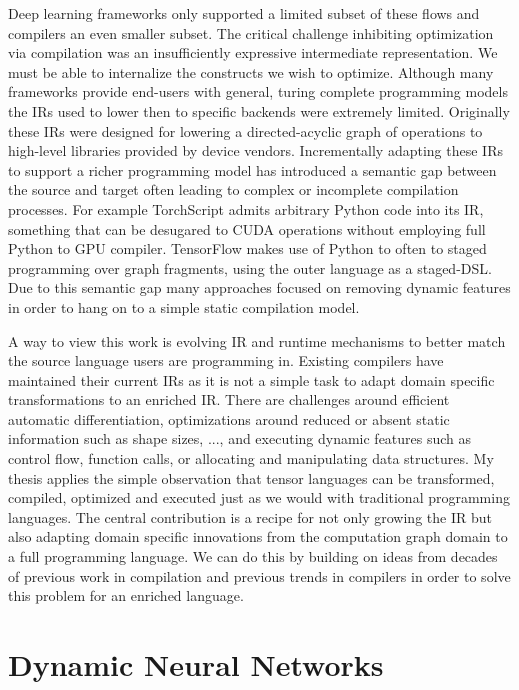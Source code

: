 Deep learning frameworks only supported a limited subset of these flows
  and compilers an even smaller subset.
The critical challenge inhibiting optimization via compilation
  was an insufficiently expressive intermediate representation.
We must be able to internalize the constructs we wish to optimize.
Although many frameworks provide end-users with general, turing
  complete programming models the IRs used to lower then to specific
  backends were extremely limited.
Originally these IRs were designed for lowering a directed-acyclic
  graph of operations to high-level libraries provided by device vendors.
Incrementally adapting these IRs to support a richer programming
  model has introduced a semantic gap between the source and target often
  leading to complex or incomplete compilation processes.
For example TorchScript admits arbitrary Python code into its IR, something
  that can be desugared to CUDA operations without employing full Python to GPU compiler.
TensorFlow makes use of Python to often to staged programming over graph fragments,
  using the outer language as a staged-DSL.
Due to this semantic gap many approaches focused on removing dynamic features in
  order to hang on to a simple static compilation model.

A way to view this work is evolving IR and runtime mechanisms to better
  match the source language users are programming in.
Existing compilers have maintained their current IRs as it is not a simple
  task to adapt domain specific transformations to an enriched IR.
There are challenges around efficient automatic differentiation, optimizations around
  reduced or absent static information such as shape sizes, ..., and executing dynamic
  features such as control flow, function calls, or allocating and manipulating data
  structures.
My thesis applies the simple observation that tensor languages can be transformed, compiled,
  optimized and executed just as we would with traditional programming languages.
The central contribution is a recipe for not only growing the IR but also
  adapting domain specific innovations from the computation graph domain to
  a full programming language.
We can do this by building on ideas from decades of previous work in compilation and previous
    trends in compilers in order to solve this problem for an enriched language.

\section{Dynamic Neural Networks}

